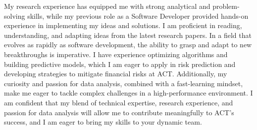 \documentclass[11pt, a4paper]{awesome-cv}
\begin{document}
\begin{cvletter}
My research experience has equipped me with strong analytical and problem-solving skills, while my previous role as a Software Developer provided hands-on experience in implementing my ideas and solutions. I am proficient in reading, understanding, and adapting ideas from the latest research papers. In a field that evolves as rapidly as software development, the ability to grasp and adapt to new breakthroughs is imperative. I have experience optimizing algorithms and building predictive models, which I am eager to apply in risk prediction and developing strategies to mitigate financial risks at ACT. Additionally, my curiosity and passion for data analysis, combined with a fast-learning mindset, make me eager to tackle complex challenges in a high-performance environment. I am confident that my blend of technical expertise, research experience, and passion for data analysis will allow me to contribute meaningfully to ACT's success, and I am eager to bring my skills to your dynamic team.
\end{cvletter}


\makeletterclosing
\end{document}
